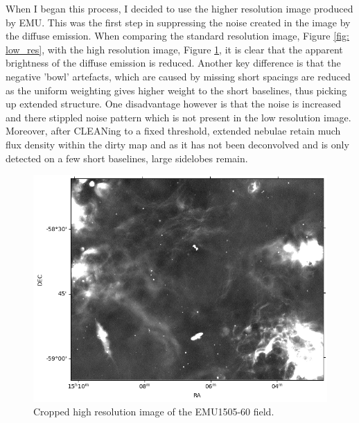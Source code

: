 When I began this process, I decided to use the higher resolution image produced by EMU. This was the first step in suppressing the noise created in the image by the diffuse emission. When comparing the standard resolution image, Figure \ref{fig: low_res}, with the high resolution image, Figure \ref{fig: high res}, it is clear that the apparent brightness of the diffuse emission is reduced. Another key difference is that the negative 'bowl' artefacts, which are caused by missing short spacings are reduced as the uniform weighting gives higher weight to the short baselines, thus picking up extended structure. One disadvantage however is that the noise is increased and there stippled noise pattern which is not present in the low resolution image. Moreover, after CLEANing to a fixed threshold, extended nebulae retain much flux density within the dirty map and as it has not been deconvolved and is only detected on a few short baselines, large sidelobes remain.

\begin{figure}
    \centering
    \includegraphics[width=1\linewidth]{Thesis_Template//Figures/high_res_crop.png}
    \caption{Cropped high resolution image of the EMU1505-60 field.}
    \label{fig: high res}
\end{figure}


